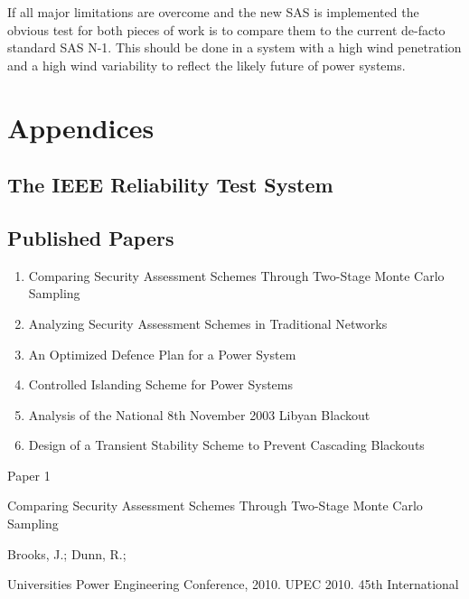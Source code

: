 \documentclass[a4paper,oneside,12pt]{report}
\begin{document}
If all major limitations are overcome and the new SAS is implemented the obvious test for both pieces of work is to compare them to the current de-facto standard SAS N-1. This should be done in a system with a high wind penetration and a high wind variability to reflect the likely future of power systems.


\appendix

\part*{Appendices}


\chapter{The IEEE Reliability Test System}\label{paper_rts}



\chapter{Published Papers}

\begin{large}
\begin{enumerate}
\item Comparing Security Assessment Schemes Through Two-Stage Monte Carlo Sampling
\item Analyzing Security Assessment Schemes in Traditional Networks
\item An Optimized Defence Plan for a Power System
\item Controlled Islanding Scheme for Power Systems
\item Analysis of the National 8th November 2003 Libyan Blackout
\item Design of a Transient Stability Scheme to Prevent Cascading Blackouts
\end{enumerate}
\end{large}

\pagebreak


\begin{center}\begin{large}
{\Huge Paper 1}
\vspace{40px}

Comparing Security Assessment Schemes Through Two-Stage Monte Carlo Sampling
\vspace{40px}

Brooks, J.; Dunn, R.;
\vspace{40px}

Universities Power Engineering Conference, 2010. UPEC 2010. 45th International
\end{large}\end{center}
\end{document}
